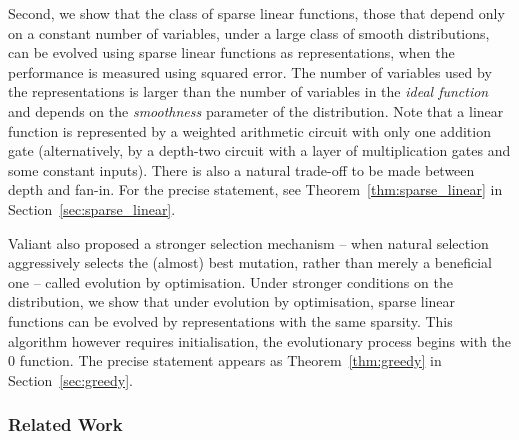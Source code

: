 Second, we show that the class of sparse linear functions, those that depend
only on a constant number of variables, under a large class of smooth
distributions, can be evolved using sparse linear functions as representations,
when the performance is measured using squared error. The number of variables
used by the representations is larger than the number of variables in the
\emph{ideal function} and depends on the \emph{smoothness} parameter of the
distribution.  Note that a linear function is represented by a weighted
arithmetic circuit with only one addition gate (alternatively, by a depth-two
circuit with a layer of multiplication gates and some constant inputs). There
is also a natural trade-off to be made between depth and fan-in. For the
precise statement, see Theorem~\ref{thm:sparse_linear} in
Section~\ref{sec:sparse_linear}.

Valiant also proposed a stronger selection mechanism -- when natural selection
aggressively selects the (almost) best mutation, rather than merely a beneficial
one -- called evolution by optimisation.  Under stronger conditions on the
distribution, we show that under evolution by optimisation, sparse linear
functions can be evolved by representations with the same sparsity. This
algorithm however requires initialisation, \ie the evolutionary process
begins with the $0$ function. The precise statement appears as
Theorem~\ref{thm:greedy} in Section~\ref{sec:greedy}.

\subsubsection*{Related Work}

